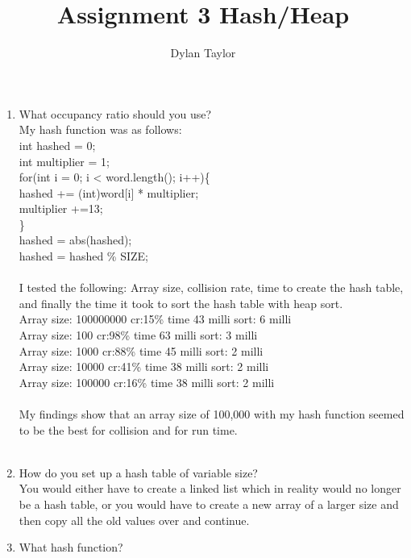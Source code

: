 \documentclass[11pt]{article} %
\title{Assignment 3 Hash/Heap }
\author{Dylan Taylor}
\begin{document}
\maketitle 
	
\begin{enumerate}
\item What occupancy ratio should you use? \\
My hash function was as follows:\\
       	int hashed = 0;\\
        int multiplier = 1;\\
        for(int i = 0; i < word.length(); i++)\{\\
            hashed += (int)word[i] * multiplier;\\
            multiplier +=13;\\
        \}\\
        hashed = abs(hashed);\\
        hashed = hashed \% SIZE;\\\\
I tested the following: Array size, collision rate, time to create the hash table, and finally the time it took to sort the hash table with heap sort.\\

Array size: 100000000 	cr:15\% time 43 milli	sort: 6 milli\\
Array size: 100 	  	cr:98\% time 63 milli	sort: 3 milli\\
Array size: 1000		cr:88\% time 45 milli	sort: 2 milli\\
Array size: 10000		cr:41\% time 38 milli	sort: 2 milli\\
Array size: 100000		cr:16\% time 38 milli	sort: 2 milli \\\\
My findings show that an array size of 100,000 with my hash function seemed to be the best for collision and for run time.\\\\
\item  How do you set up a hash table of variable size?	\\

You would either have to create a linked list which in reality would no longer be a hash table, or you would have to create a new array of a larger size and then copy all the old values over and continue.\\

\item What hash function? \\


\end{enumerate}
\end{document}
